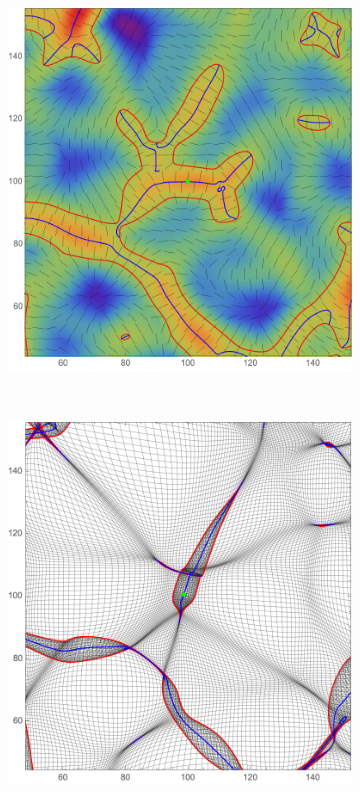 \documentclass[a4paper, 11pt]{article}
\begin{document}
\begin{figure}
\begin{subfigure}[b]{0.31\textwidth}
\end{subfigure}~
\begin{subfigure}[b]{0.31\textwidth}
\includegraphics[width=\textwidth]{Rotation_L_3}
\end{subfigure}\\
\begin{subfigure}[b]{0.31\textwidth}
\includegraphics[width=\textwidth]{Rotation_Z_1}

\end{subfigure}
\end{figure}
\end{document}
